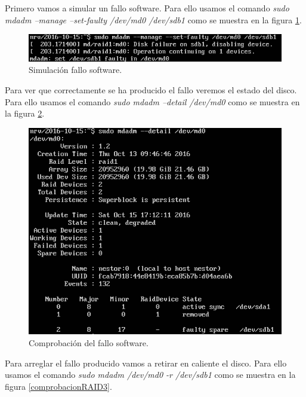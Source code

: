 \documentclass[a4paper,titlepage,12pt]{scrartcl}	%
\numberwithin{figure}{section} %
\numberwithin{table}{section} %
\begin{document}
	Primero vamos a simular un fallo software. Para ello usamos el comando \textit{sudo mdadm --manage --set-faulty /dev/md0 /dev/sdb1} como se muestra en la figura \ref{comprobacionRAID1}.	
	
	\begin{figure}[H]
		\includegraphics[width=\linewidth]{./Imagenes/ComprobarRAID1.png}
		\vspace{-0.5cm}
		\caption[Simulación fallo software.]{Simulación fallo software.}
		\label{comprobacionRAID1}
	\end{figure}
	
	Para ver que correctamente se ha producido el fallo veremos el estado del disco. Para ello usamos el comando \textit{sudo mdadm --detail /dev/md0} como se muestra en la figura \ref{comprobacionRAID2}.
	
	\begin{figure}[H]
		\centering
		\includegraphics[scale=0.68]{./Imagenes/ComprobarRAID2.png}
		\caption[Comprobación del fallo software.]{Comprobación del fallo software.}
		\label{comprobacionRAID2}
	\end{figure}
	
	Para arreglar el fallo producido vamos a retirar en caliente el disco. Para ello usamos el comando \textit{sudo mdadm /dev/md0 -r /dev/sdb1} como se muestra en la figura \ref{comprobacionRAID3}.	
	
\end{document}
